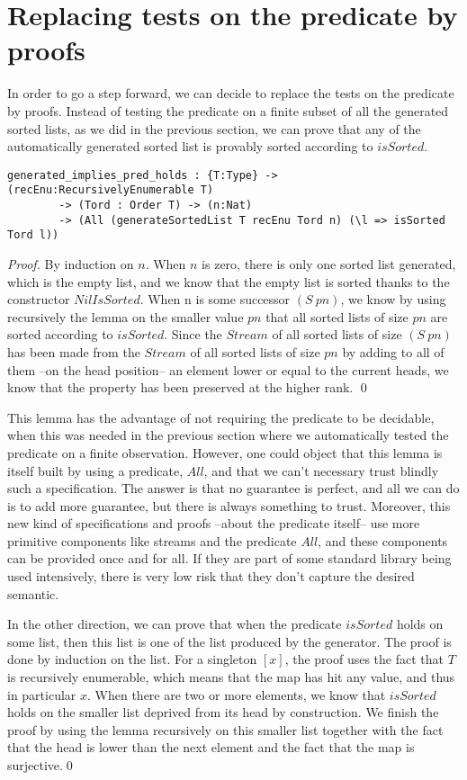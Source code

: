 \section{Replacing tests on the predicate by proofs}

\label{sect:aStepForward}

In order to go a step forward, we can decide to replace the tests on the predicate by proofs. Instead of testing the predicate on a finite subset of all the generated sorted lists, as we did in the previous section, we can prove that any of the automatically generated sorted list is provably sorted according to $isSorted$.

\begin{lstlisting}
generated_implies_pred_holds : {T:Type} -> (recEnu:RecursivelyEnumerable T) 
        -> (Tord : Order T) -> (n:Nat) 
        -> (All (generateSortedList T recEnu Tord n) (\l => isSorted Tord l))
\end{lstlisting}
\begin{proof}
By induction on $n$.
When $n$ is zero, there is only one sorted list generated, which is the empty list, and we know that the empty list is sorted thanks to the constructor $NilIsSorted$. When n is some successor $(S\ pn)$, we know by using recursively the lemma on the smaller value $pn$ that all sorted lists of size $pn$ are sorted according to $isSorted$. Since the $Stream$ of all sorted lists of size $(S\ pn)$ has been made from the $Stream$ of all sorted lists of size $pn$ by adding to all of them --on the head position-- an element lower or equal to the current heads, we know that the property has been preserved at the higher rank.
\qed
\end{proof}

This lemma has the advantage of not requiring the predicate to be decidable, when this was needed in the previous section where we automatically tested the predicate on a finite observation. However, one could object that this lemma is itself built by using a predicate, $All$, and that we can't necessary trust blindly such a specification. The answer is that no guarantee is perfect, and all we can do is to add more guarantee, but there is always something to trust. Moreover, this new kind of specifications and proofs --about the predicate itself-- use more primitive components like streams and the predicate $All$, and these components can be provided once and for all. If they are part of some standard library being used intensively, there is very low risk that they don't capture the desired semantic.

In the other direction, we can prove that when the predicate $isSorted$ holds on some list, then this list is one of the list produced by the generator. The proof is done by induction on the list. For a singleton $[x]$, the proof uses the fact that $T$ is recursively enumerable, which means that the map has hit any value, and thus in particular $x$. When there are two or more elements, we know that $isSorted$ holds on the smaller list deprived from its head by construction. We finish the proof by using the lemma recursively on this smaller list together with the fact that the head is lower than the next element and the fact that the map is surjective.\qed
